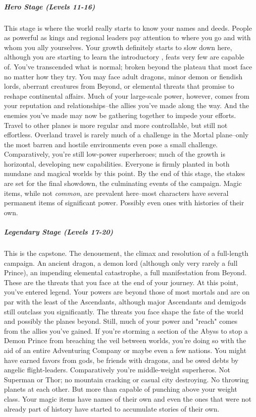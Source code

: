 \subparagraph*{Hero Stage (Levels 11-16)}
This stage is where the world really starts to know your names and deeds. People as powerful as kings and regional leaders pay attention to where you go and with whom you ally yourselves. Your growth definitely starts to slow down here, although you are starting to learn the introductory , feats very few are capable of. You've transcended what is normal; broken beyond the plateau that most face no matter how they try. You may face adult dragons, minor demon or fiendish lords, aberrant creatures from Beyond, or elemental threats that promise to reshape continental affairs. Much of your large-scale power, however, comes from your reputation and relationships--the allies you've made along the way. And the enemies you've made may now be gathering together to impede your efforts. Travel to other planes is more regular and more controllable, but still not effortless. Overland travel is rarely much of a challenge in the Mortal plane--only the most barren and hostile environments even pose a small challenge. Comparatively, you're still low-power superheroes; much of the growth is horizontal, developing new capabilities. Everyone is firmly planted in both mundane and magical worlds by this point. By the end of this stage, the stakes are set for the final showdown, the culminating events of the campaign. Magic items, while not \textit{common}, are prevalent here--most characters have several permanent items of significant power. Possibly even ones with histories of their own.

\subparagraph*{Legendary Stage (Levels 17-20)}
This is the capstone. The denouement, the climax and resolution of a full-length campaign. An ancient dragon, a demon lord (although only very rarely a full Prince), an impending elemental catastrophe, a full manifestation from Beyond. These are the threats that you face at the end of your journey. At this point, you've entered legend. Your powers are beyond those of most mortals and are on par with the least of the Ascendants, although major Ascendants and demigods still outclass you significantly. The threats you face shape the fate of the world and possibly the planes beyond. Still, much of your power and "reach" comes from the allies you've gained. If you're storming a section of the Abyss to stop a Demon Prince from breaching the veil between worlds, you're doing so with the aid of an entire Adventuring Company or maybe even a few nations. You might have earned favors from gods, be friends with dragons, and be owed debts by angelic flight-leaders. Comparatively you're middle-weight superheros. Not Superman or Thor; no mountain cracking or casual city destroying. No throwing planets at each other. But more than capable of punching above your weight class. Your magic items have names of their own and even the ones that were not already part of history have started to accumulate stories of their own.